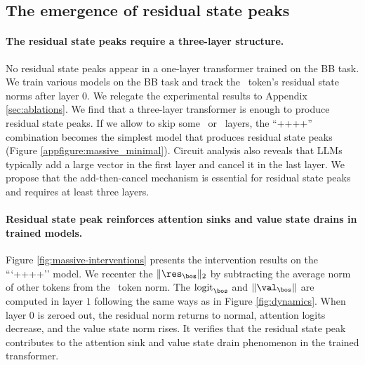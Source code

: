 \subsection{The emergence of residual state peaks}
\paragraph{The residual state peaks require a three-layer structure.}  No residual state peaks appear in a one-layer transformer trained on the BB task. We train various models on the BB task and track the \bos~token’s residual state norms after layer $0$. We relegate the experimental results to Appendix \ref{sec:ablations}. We find that a three-layer transformer is enough to produce residual state peaks. 
If we allow to skip some \mlp~or \attn~layers, the ``\attn+\mlp+\attn+\mlp+\mlp'' combination becomes the simplest model that produces residual state peaks (Figure \ref{appfigure:massive_minimal}). Circuit analysis also reveals that LLMs typically add a large vector in the first layer and cancel it in the last layer. We propose that the add-then-cancel mechanism is essential for residual state peaks and requires at least three layers.

\paragraph{Residual state peak reinforces attention sinks and value state drains in trained models.} Figure \ref{fig:massive-interventions} presents the intervention results on the ```\attn+\mlp+\attn+\mlp+\mlp'' model. We recenter the $\|\res_{\bos}\|_2$ by subtracting the average norm of other tokens from the \bos~token norm. The $\text{logit}_{\bos}$ and $\|\val_{\bos}\|$ are computed in layer $1$ following the same ways as in Figure \ref{fig:dynamics}. When layer 0 is zeroed out, the residual norm returns to normal, attention logits decrease, and the value state norm rises. It verifies that the residual state peak contributes to the attention sink and value state drain phenomenon in the trained transformer.


